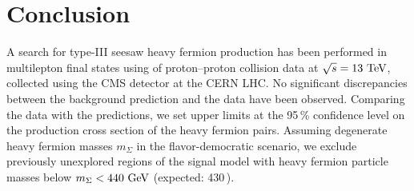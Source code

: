 \chapter{Conclusion}
\label{sec:Summary}

A search for type-III seesaw heavy fermion production has been performed in multilepton final states using \fullLumi of proton--proton collision data at $\sqrt{s} = 13\,\,\text{Te\hspace{-.08em}V}$, collected using the CMS detector at the CERN LHC. No significant discrepancies between the background prediction and the data have been observed. Comparing the data with the predictions, we set upper limits at the 95\,\% confidence level on the production cross section of the heavy fermion pairs. Assuming degenerate heavy fermion masses $m_\Sigma$ in the flavor-democratic scenario, we exclude previously unexplored regions of the signal model with heavy fermion particle masses below $m_\Sigma < 440\,\,\text{Ge\hspace{-.08em}V}$ (expected: 430\,\GeV).
